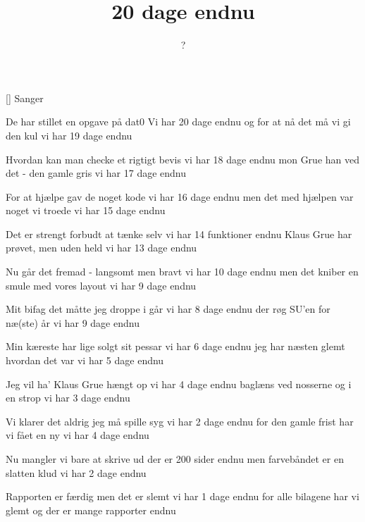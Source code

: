 \documentclass[a4paper,11pt]{article}
\title{20 dage endnu}
\author{?}
\begin{document}
\maketitle

\begin{roles}
[] Sanger
\end{roles}

\begin{song}
  De har stillet en opgave på dat0
  Vi har 20 dage endnu
  og for at nå det må vi gi den kul
  vi har 19 dage endnu

  Hvordan kan man checke et rigtigt bevis
vi har 18 dage endnu
mon Grue han ved det - den gamle gris
vi har 17 dage endnu

For at hjælpe gav de noget kode
vi har 16 dage endnu
men det med hjælpen var noget vi troede
vi har 15 dage endnu

Det er strengt forbudt at tænke selv
vi har 14 funktioner endnu
Klaus Grue har prøvet, men uden held
vi har 13 dage endnu

Nu går det fremad - langsomt men bravt
vi har 10 dage endnu
men det kniber en smule med vores layout
vi har 9 dage endnu

Mit bifag det måtte jeg droppe i går
vi har 8 dage endnu
der røg SU'en for næ(ste) år
vi har 9 dage endnu

Min kæreste har lige solgt sit pessar
vi har 6 dage endnu
jeg har næsten glemt hvordan det var
vi har 5 dage endnu

Jeg vil ha' Klaus Grue hængt op
vi har 4 dage endnu
baglæns ved nosserne og i en strop
vi har 3 dage endnu

Vi klarer det aldrig jeg må spille syg
vi har 2 dage endnu
for den gamle frist har vi fået en ny
vi har 4 dage endnu

Nu mangler vi bare at skrive ud
der er 200 sider endnu
men farvebåndet er en slatten klud
vi har 2 dage endnu

Rapporten er færdig men det er slemt
vi har 1 dage endnu
for alle bilagene har vi glemt
og der er mange rapporter endnu
\end{song}
\end{document}
